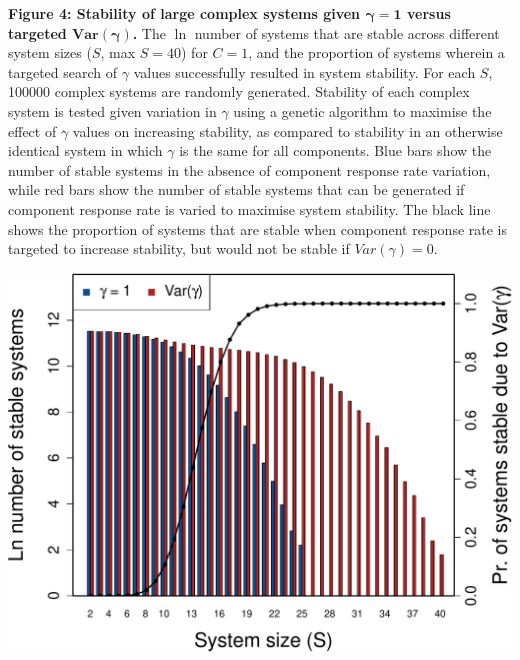 \documentclass[]{article}
\begin{document}
\clearpage

\textbf{Figure 4: Stability of large complex systems given
\(\boldsymbol{\gamma = 1}\) versus targeted
\(\boldsymbol{Var(\gamma)}\).} The \(\ln\) number of systems that are
stable across different system sizes (\(S\), max \(S=40\)) for
\(C = 1\), and the proportion of systems wherein a targeted search of
\(\gamma\) values successfully resulted in system stability. For each
\(S\), 100000 complex systems are randomly generated. Stability of each
complex system is tested given variation in \(\gamma\) using a genetic
algorithm to maximise the effect of \(\gamma\) values on increasing
stability, as compared to stability in an otherwise identical system in
which \(\gamma\) is the same for all components. Blue bars show the
number of stable systems in the absence of component response rate
variation, while red bars show the number of stable systems that can be
generated if component response rate is varied to maximise system
stability. The black line shows the proportion of systems that are
stable when component response rate is targeted to increase stability,
but would not be stable if \(Var(\gamma) = 0\).

\includegraphics{ms_files/figure-latex/unnamed-chunk-16-1.pdf}
\end{document}
